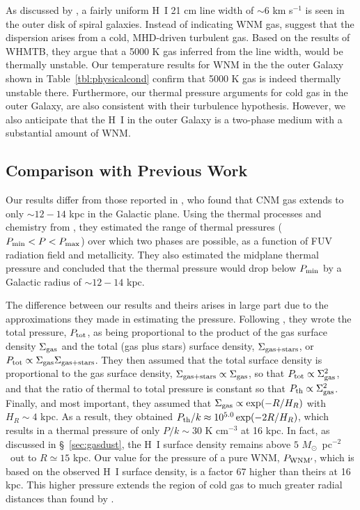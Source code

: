 \documentclass[12pt,preprint,flushrt]{aastex}
\newcommand{\ee}{$^{-2}$}
\newcommand{\pth}{P_{\rm th}}
\begin{document}
As discussed by \cite{sel99}, a fairly uniform H~I 21 cm line width
of $\sim 6$ km s$^{-1}$ is seen in the outer disk of spiral galaxies.
Instead of indicating WNM gas, \cite{sel99} suggest that the
dispersion arises from a cold, MHD-driven turbulent gas. Based on the
results of WHMTB, they argue that a 5000 K gas inferred from the
line width, would be thermally unstable. Our temperature
results for WNM in the the outer Galaxy shown in Table~\ref{tbl:physicalcond}
confirm that 5000 K gas is indeed thermally unstable there.
Furthermore, our
thermal pressure arguments for cold gas in the outer Galaxy,
are also consistent with their turbulence hypothesis.
However, we also anticipate that the H~I in the outer Galaxy
is a two-phase medium with a substantial amount of WNM.

\subsection{Comparison with Previous Work}
\label{sub:prev}

Our results differ from those reported in \cite{elm94}, who found that
CNM gas extends to only $\sim 12 - 14$ kpc in the Galactic plane.
Using the thermal processes and chemistry from \cite{par87},
they estimated the range of thermal pressures ($P_{\rm min}<P
<P_{\rm max}$) over which two phases are possible, as a function
of FUV radiation field and metallicity. They also estimated the
midplane thermal pressure and concluded that the thermal pressure
would drop below $P_{\rm min}$ by a Galactic radius of $\sim 12 - 14$ kpc.

The difference between our results and theirs
arises in large part due to the approximations they
made in estimating the pressure.
Following \cite{elm89}, they wrote the total pressure, $P_{\rm tot}$,
as being proportional to the product of the gas 
surface density $\Sigma_{\rm gas}$ and the total
(gas plus stars) surface density, $\Sigma_{\rm gas+stars}$, or
$P_{\rm tot} \propto \Sigma_{\rm gas} \Sigma_{\rm gas+stars}$.
They then assumed
that the total surface density is proportional
to the gas surface density, $\Sigma_{\rm gas+stars}\propto \Sigma_{\rm gas}$,
so that $P_{\rm tot}\propto \Sigma_{\rm gas}^2$,
and that the ratio of thermal to total
pressure is constant so that
$P_{\rm th} \propto \Sigma_{\rm gas}^2$.
Finally, and most important, they assumed that
$\Sigma_{\rm gas}\propto \exp(-R/H_R)$ with $H_R\sim 4$ kpc.
As a result, they obtained
$\pth/k\approx 10^{5.0}\exp(-2R/H_R)$, which
results in a thermal pressure of only
$P/k \sim 30$ K cm$^{-3}$ at 16 kpc.  In fact, as discussed in
\S~\ref{sec:gasdust}, the H~I surface density remains above
$5\,\, M_\odot$~pc\ee\ out to $R\simeq 15$ kpc.
Our value for the pressure of a pure WNM,
$P_{\rm WNM'}$, which is based on the
observed H~I surface density, is a factor 67 higher
than theirs at 16 kpc. This higher
pressure extends the region of cold gas to much greater radial distances
than found by \cite{elm94}.
\end{document}
